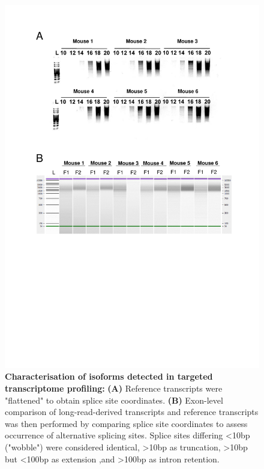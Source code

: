 \begin{figure}[htp]
	\centering
	\includegraphics[page=7,trim={0cm 3cm 0cm 0cm},clip,scale = 0.75]{Figures/TargetedTranscriptome_LabResults}
	\captionsetup{width=0.95\textwidth,singlelinecheck=off}
	\caption[Characterisation of isoforms detected in targeted transcriptome profiling]%
	{\textbf{Characterisation of isoforms detected in targeted transcriptome profiling:} \textbf{(A)} Reference transcripts were "flattened" to obtain splice site coordinates. \textbf{(B)} Exon-level comparison of long-read-derived transcripts and reference transcripts was then performed by comparing splice site coordinates to assess occurrence of alternative splicing sites. Splice sites differing <10bp ("wobble") were considered identical, >10bp as truncation, >10bp but <100bp as extension ,and >100bp as intron retention.  
	}
	\label{fig:Targeted_isoforms_annotate}
\end{figure}


